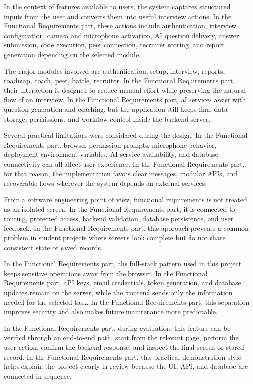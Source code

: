 \documentclass[12pt,a4paper]{report}
\begin{document}
In the context of features available to users, the system captures structured inputs from the user and converts them into useful interview actions. In the Functional Requirements part, these actions include authentication, interview configuration, camera and microphone activation, AI question delivery, answer submission, code execution, peer connection, recruiter scoring, and report generation depending on the selected module.


The major modules involved are authentication, setup, interview, reports, roadmap, coach, peer, battle, recruiter. In the Functional Requirements part, their interaction is designed to reduce manual effort while preserving the natural flow of an interview. In the Functional Requirements part, aI services assist with question generation and coaching, but the application still keeps final data storage, permissions, and workflow control inside the backend server.


Several practical limitations were considered during the design. In the Functional Requirements part, browser permission prompts, microphone behavior, deployment environment variables, AI service availability, and database connectivity can all affect user experience. In the Functional Requirements part, for that reason, the implementation favors clear messages, modular APIs, and recoverable flows wherever the system depends on external services.


From a software engineering point of view, functional requirements is not treated as an isolated screen. In the Functional Requirements part, it is connected to routing, protected access, backend validation, database persistence, and user feedback. In the Functional Requirements part, this approach prevents a common problem in student projects where screens look complete but do not share consistent state or saved records.


In the Functional Requirements part, the full-stack pattern used in this project keeps sensitive operations away from the browser. In the Functional Requirements part, aPI keys, email credentials, token generation, and database updates remain on the server, while the frontend sends only the information needed for the selected task. In the Functional Requirements part, this separation improves security and also makes future maintenance more predictable.


In the Functional Requirements part, during evaluation, this feature can be verified through an end-to-end path: start from the relevant page, perform the user action, confirm the backend response, and inspect the final screen or stored record. In the Functional Requirements part, this practical demonstration style helps explain the project clearly in review because the UI, API, and database are connected in sequence.
\end{document}
